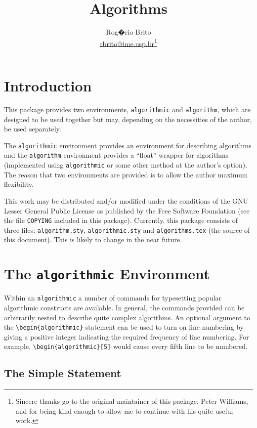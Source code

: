 \documentclass{article}
\title{Algorithms}
\author{Rog�rio Brito\\
  \href{mailto:rbrito@ime.usp.br}{rbrito@ime.usp.br}\thanks{Sincere thanks
    go to the original maintainer of this package, Peter Williams, and for
    being kind enough to allow me to continue with his quite useful work.}}
\newcommand{\keyword}[1]{\texttt{#1}}
\newcommand{\filename}[1]{\texttt{#1}}
\begin{document}
\maketitle
\tableofcontents

\section{Introduction}

This package provides two environments, \keyword{algorithmic} and
\keyword{algorithm}, which are designed to be used together but may,
depending on the necessities of the author, be used separately.

The \keyword{algorithmic} environment provides an environment for
describing algorithms and the \keyword{algorithm} environment provides a
``float'' wrapper for algorithms (implemented using \keyword{algorithmic}
or some other method at the author's option).  The reason that two
environments are provided is to allow the author maximum flexibility.

This work may be distributed and/or modified under the conditions of the
GNU Lesser General Public License as published by the Free Software
Foundation (see the file \filename{COPYING} included in this package).
Currently, this package consists of three files: \filename{algorithm.sty},
\filename{algorithmic.sty} and \filename{algorithms.tex} (the source of
this document). This is likely to change in the near future.

\section{The \keyword{algorithmic} Environment}
\label{sec:algorithmic-envir}
Within an \keyword{algorithmic} a number of commands for typesetting
popular algorithmic constructs are available.
In general, the commands provided can be arbitrarily nested to
describe quite complex algorithms.
An optional argument to the \verb+\begin{algorithmic}+ statement can be
used to turn on line numbering by giving a positive integer indicating the
required frequency of line numbering.
For example, \verb+\begin{algorithmic}[5]+ would cause every fifth line to
be numbered.

\subsection{The Simple Statement}
\end{document}
